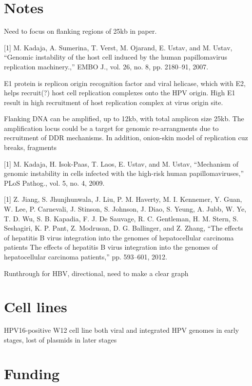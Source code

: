 \documentclass{bioinfo}
\begin{document}
\section{Notes}

Need to focus on flanking regions of 25kb in paper.


[1] M. Kadaja, A. Sumerina, T. Verst, M. Ojarand, E. Ustav, and M. Ustav, “Genomic instability of the host cell induced by the human papillomavirus replication machinery.,” EMBO J., vol. 26, no. 8, pp. 2180–91, 2007.

E1 protein is replicon origin recognition factor and viral helicase, which with E2, helps recruit(?) host cell replication complexes onto the HPV origin.  High E1 result in high recruitment of host replication complex at virus origin site.

Flanking DNA can be amplified, up to 12kb, with total amplicon size 25kb.  The amplification locus could be a target for genomic re-arrangments due to recruitment of DDR mechanisms.  In addition, onion-skin model of replication cuz breaks, fragments

[1] M. Kadaja, H. Isok-Paas, T. Laos, E. Ustav, and M. Ustav, “Mechanism of genomic instability in cells infected with the high-risk human papillomaviruses,” PLoS Pathog., vol. 5, no. 4, 2009.



[1] Z. Jiang, S. Jhunjhunwala, J. Liu, P. M. Haverty, M. I. Kennemer, Y. Guan, W. Lee, P. Carnevali, J. Stinson, S. Johnson, J. Diao, S. Yeung, A. Jubb, W. Ye, T. D. Wu, S. B. Kapadia, F. J. De Sauvage, R. C. Gentleman, H. M. Stern, S. Seshagiri, K. P. Pant, Z. Modrusan, D. G. Ballinger, and Z. Zhang, “The effects of hepatitis B virus integration into the genomes of hepatocellular carcinoma patients The effects of hepatitis B virus integration into the genomes of hepatocellular carcinoma patients,” pp. 593–601, 2012.

Runthrough for HBV, directional, need to make a clear graph
\section{Cell lines}
HPV16-positive W12 cell line both viral and integrated HPV genomes in early stages, lost of plasmids in later stages


\section*{Funding}
\end{document}
